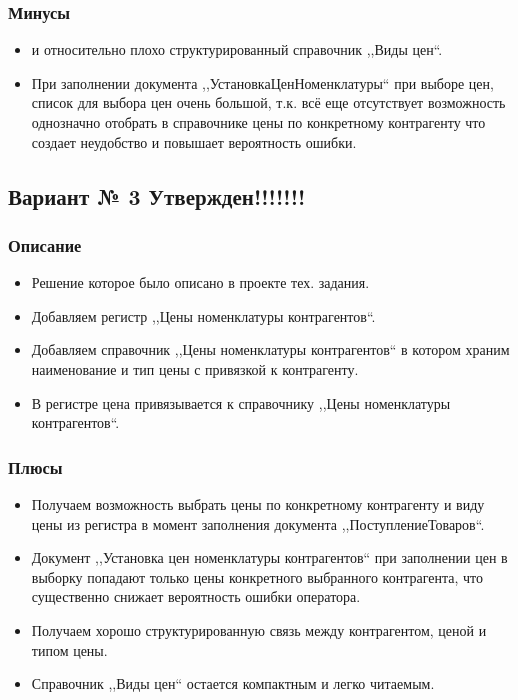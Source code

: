 \subsubsection{Минусы}
\begin{itemize}	
\item {} и относительно плохо структурированный справочник ,,Виды цен``.
\item При заполнении документа ,,УстановкаЦенНоменклатуры`` при выборе цен, список для выбора цен очень большой, т.к. всё еще отсутствует возможность однозначно отобрать в справочнике цены по конкретному контрагенту что создает неудобство и повышает вероятность ошибки.
\end{itemize}


\subsection{Вариант № 3 Утвержден!!!!!!!}
\subsubsection{Описание}
\begin{itemize}	
\item Решение которое было описано в проекте тех. задания.
\item Добавляем регистр ,,Цены номенклатуры контрагентов``.
\item Добавляем справочник ,,Цены номенклатуры контрагентов`` в котором храним наименование и тип цены с привязкой к контрагенту.
\item В регистре цена привязывается к справочнику ,,Цены номенклатуры контрагентов``.
\end{itemize}
\subsubsection{Плюсы}
\begin{itemize}	
\item Получаем возможность выбрать цены по конкретному контрагенту и виду цены  из регистра в момент заполнения документа ,,ПоступлениеТоваров``.

\item Документ ,,Установка цен номенклатуры контрагентов`` при заполнении цен в выборку попадают только цены конкретного выбранного контрагента, что существенно снижает вероятность ошибки оператора.
\item Получаем хорошо структурированную связь между контрагентом, ценой и типом цены.	
\item Справочник ,,Виды цен`` остается компактным и легко читаемым.
\end{itemize}
